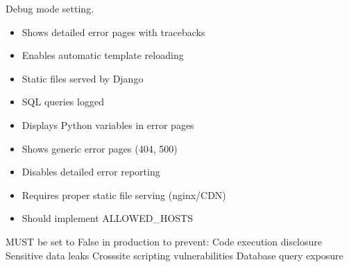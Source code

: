 \documentclass[letterpaper,10pt,english]{sphinxmanual}
\begin{document}
\begin{fulllineitems}
\label{\detokenize{softwareProject:softwareProject.settings.DEBUG}}
\pysigstartsignatures
\pysigline
{}
\pysigstopsignatures
\sphinxAtStartPar
Debug mode setting.
\begin{description}
\begin{itemize}
\item {} 
\sphinxAtStartPar
Shows detailed error pages with tracebacks

\item {} 
\sphinxAtStartPar
Enables automatic template reloading

\item {} 
\sphinxAtStartPar
Static files served by Django

\item {} 
\sphinxAtStartPar
SQL queries logged

\item {} 
\sphinxAtStartPar
Displays Python variables in error pages

\end{itemize}

\begin{itemize}
\item {} 
\sphinxAtStartPar
Shows generic error pages (404, 500)

\item {} 
\sphinxAtStartPar
Disables detailed error reporting

\item {} 
\sphinxAtStartPar
Requires proper static file serving (nginx/CDN)

\item {} 
\sphinxAtStartPar
Should implement ALLOWED\_HOSTS

\end{itemize}

\sphinxAtStartPar
MUST be set to False in production to prevent:
\sphinxhyphen{} Code execution disclosure
\sphinxhyphen{} Sensitive data leaks
\sphinxhyphen{} Cross\sphinxhyphen{}site scripting vulnerabilities
\sphinxhyphen{} Database query exposure

\end{description}

\end{fulllineitems}
\end{document}
